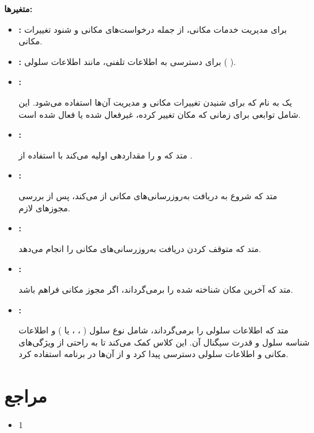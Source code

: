 \documentclass{report}
\begin{document}
 
\textbf{متغیرها:}
\begin{itemize}
	\item \textbf{:} برای مدیریت خدمات مکانی، از جمله درخواست‌های مکانی و شنود تغییرات مکانی.
	\item \textbf{:} برای دسترسی به اطلاعات تلفنی، مانند اطلاعات سلولی (
	).
	\item \textbf{:}
	
	یک
	به نام 
	که برای شنیدن تغییرات مکانی و مدیریت آن‌ها استفاده می‌شود. این شامل توابعی برای زمانی که مکان تغییر کرده، غیرفعال شده یا فعال شده است.
	\item \textbf{:}
	
	متد
	که
	و
	را مقداردهی اولیه می‌کند با استفاده از
	.
	\item \textbf{:}
	
	متد
	که شروع به دریافت به‌روزرسانی‌های مکانی از
	می‌کند، پس از بررسی مجوزهای لازم.
	\item 
	\textbf{:}
	
	متد
	که متوقف کردن دریافت به‌روزرسانی‌های مکانی را انجام می‌دهد.
	\item 
	\textbf{:}
	
	متد
	که آخرین مکان شناخته شده را برمی‌گرداند، اگر مجوز مکانی فراهم باشد.
	\item 
	\textbf{:}
	
	متد
	که اطلاعات سلولی را برمی‌گرداند، شامل نوع سلول (
	،
	،
	یا
	) و اطلاعات شناسه سلول و قدرت سیگنال آن.
	این کلاس کمک می‌کند تا به راحتی از ویژگی‌های مکانی و اطلاعات سلولی دسترسی پیدا کرد و از آن‌ها در برنامه‌ استفاده کرد.
\end{itemize}
   

\chapter {مراجع}
\begin{itemize}
	\item 1
\end{itemize}
\end{document}
